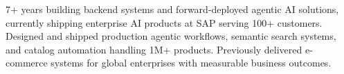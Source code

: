\overview
{7+ years building backend systems and forward-deployed agentic AI solutions, currently shipping enterprise AI products at SAP serving 100+ customers. Designed and shipped production agentic workflows, semantic search systems, and catalog automation handling 1M+ products. Previously delivered e-commerce systems for global enterprises with measurable business outcomes.}


